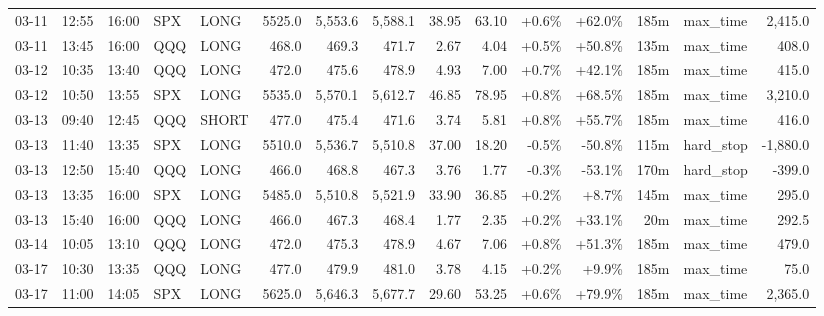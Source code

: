 \documentclass[11pt,a4paper,twoside]{article}
\begin{document}
\begin{landscape}
\begin{center}
\begin{longtable}{>{\color{txtmain}}l l l l l r r r r r r r r >{\color{txtmain}}l r}
03-11 & 12:55 & 16:00 & SPX & LONG & 5525.0 & 5,553.6 & 5,588.1 & 38.95 & 63.10 & \textcolor{wingreen}{+0.6\%} & \textcolor{wingreen}{+62.0\%} & 185m & max\_time & \textcolor{wingreen}{2,415.0} \\
03-11 & 13:45 & 16:00 & QQQ & LONG & 468.0 & 469.3 & 471.7 & 2.67 & 4.04 & \textcolor{wingreen}{+0.5\%} & \textcolor{wingreen}{+50.8\%} & 135m & max\_time & \textcolor{wingreen}{408.0} \\
03-12 & 10:35 & 13:40 & QQQ & LONG & 472.0 & 475.6 & 478.9 & 4.93 & 7.00 & \textcolor{wingreen}{+0.7\%} & \textcolor{wingreen}{+42.1\%} & 185m & max\_time & \textcolor{wingreen}{415.0} \\
03-12 & 10:50 & 13:55 & SPX & LONG & 5535.0 & 5,570.1 & 5,612.7 & 46.85 & 78.95 & \textcolor{wingreen}{+0.8\%} & \textcolor{wingreen}{+68.5\%} & 185m & max\_time & \textcolor{wingreen}{3,210.0} \\
03-13 & 09:40 & 12:45 & QQQ & SHORT & 477.0 & 475.4 & 471.6 & 3.74 & 5.81 & \textcolor{wingreen}{+0.8\%} & \textcolor{wingreen}{+55.7\%} & 185m & max\_time & \textcolor{wingreen}{416.0} \\
03-13 & 11:40 & 13:35 & SPX & LONG & 5510.0 & 5,536.7 & 5,510.8 & 37.00 & 18.20 & \textcolor{lossred}{-0.5\%} & \textcolor{lossred}{-50.8\%} & 115m & hard\_stop & \textcolor{lossred}{-1,880.0} \\
03-13 & 12:50 & 15:40 & QQQ & LONG & 466.0 & 468.8 & 467.3 & 3.76 & 1.77 & \textcolor{lossred}{-0.3\%} & \textcolor{lossred}{-53.1\%} & 170m & hard\_stop & \textcolor{lossred}{-399.0} \\
03-13 & 13:35 & 16:00 & SPX & LONG & 5485.0 & 5,510.8 & 5,521.9 & 33.90 & 36.85 & \textcolor{wingreen}{+0.2\%} & \textcolor{wingreen}{+8.7\%} & 145m & max\_time & \textcolor{wingreen}{295.0} \\
03-13 & 15:40 & 16:00 & QQQ & LONG & 466.0 & 467.3 & 468.4 & 1.77 & 2.35 & \textcolor{wingreen}{+0.2\%} & \textcolor{wingreen}{+33.1\%} & 20m & max\_time & \textcolor{wingreen}{292.5} \\
03-14 & 10:05 & 13:10 & QQQ & LONG & 472.0 & 475.3 & 478.9 & 4.67 & 7.06 & \textcolor{wingreen}{+0.8\%} & \textcolor{wingreen}{+51.3\%} & 185m & max\_time & \textcolor{wingreen}{479.0} \\
03-17 & 10:30 & 13:35 & QQQ & LONG & 477.0 & 479.9 & 481.0 & 3.78 & 4.15 & \textcolor{wingreen}{+0.2\%} & \textcolor{wingreen}{+9.9\%} & 185m & max\_time & \textcolor{wingreen}{75.0} \\
03-17 & 11:00 & 14:05 & SPX & LONG & 5625.0 & 5,646.3 & 5,677.7 & 29.60 & 53.25 & \textcolor{wingreen}{+0.6\%} & \textcolor{wingreen}{+79.9\%} & 185m & max\_time & \textcolor{wingreen}{2,365.0} \\

\end{longtable}
\end{center}
\end{landscape}
\end{document}
